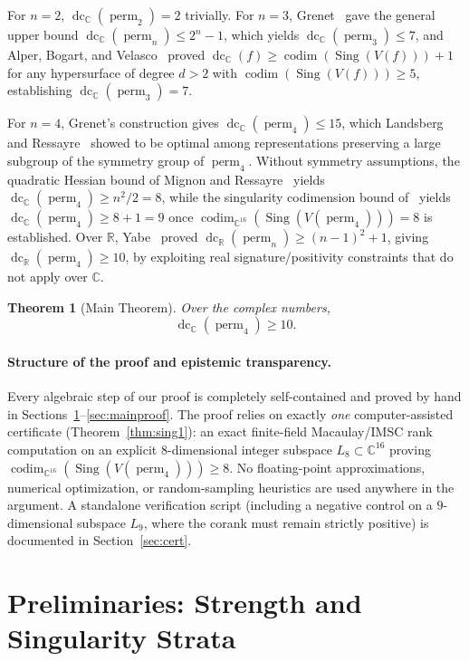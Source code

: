 \documentclass[11pt,a4paper]{article}
\newtheorem{theorem}{Theorem}[section]
\theoremstyle{definition}
\DeclareMathOperator{\perm}{perm}
\DeclareMathOperator{\dc}{dc}
\DeclareMathOperator{\codim}{codim}
\DeclareMathOperator{\Sing}{Sing}
\begin{document}
For $n = 2$, $\dc_{\mathbb{C}}(\perm_2) = 2$ trivially. For $n = 3$, Grenet~\cite{Grenet2011} gave the general upper bound $\dc_{\mathbb{C}}(\perm_n) \le 2^n - 1$, which yields $\dc_{\mathbb{C}}(\perm_3) \le 7$, and Alper, Bogart, and Velasco~\cite{ABV2017} proved $\dc_{\mathbb{C}}(f) \ge \codim(\Sing(V(f))) + 1$ for any hypersurface of degree $d > 2$ with $\codim(\Sing(V(f))) \ge 5$, establishing $\dc_{\mathbb{C}}(\perm_3) = 7$.

For $n = 4$, Grenet's construction gives $\dc_{\mathbb{C}}(\perm_4) \le 15$, which Landsberg and Ressayre~\cite{LR2017} showed to be optimal among representations preserving a large subgroup of the symmetry group of $\perm_4$. Without symmetry assumptions, the quadratic Hessian bound of Mignon and Ressayre~\cite{MR2004} yields $\dc_{\mathbb{C}}(\perm_4) \ge n^2/2 = 8$, while the singularity codimension bound of~\cite{ABV2017} yields $\dc_{\mathbb{C}}(\perm_4) \ge 8 + 1 = 9$ once $\codim_{\mathbb{C}^{16}}(\Sing(V(\perm_4))) = 8$ is established. Over $\mathbb{R}$, Yabe~\cite{Yabe2015} proved $\dc_{\mathbb{R}}(\perm_n) \ge (n-1)^2 + 1$, giving $\dc_{\mathbb{R}}(\perm_4) \ge 10$, by exploiting real signature/positivity constraints that do not apply over $\mathbb{C}$.

\begin{theorem}[Main Theorem]\label{thm:main}
Over the complex numbers,
\[
  \dc_{\mathbb{C}}(\perm_4) \ge 10.
\]
\end{theorem}

\paragraph{Structure of the proof and epistemic transparency.}
Every algebraic step of our proof is completely self-contained and proved by hand in Sections~\ref{sec:sing2}--\ref{sec:mainproof}. The proof relies on exactly \emph{one} computer-assisted certificate (Theorem~\ref{thm:sing1}): an exact finite-field Macaulay/IMSC rank computation on an explicit $8$-dimensional integer subspace $L_8 \subset \mathbb{C}^{16}$ proving $\codim_{\mathbb{C}^{16}}(\Sing(V(\perm_4))) \ge 8$. No floating-point approximations, numerical optimization, or random-sampling heuristics are used anywhere in the argument. A standalone verification script (including a negative control on a $9$-dimensional subspace $L_9$, where the corank must remain strictly positive) is documented in Section~\ref{sec:cert}.

\section{Preliminaries: Strength and Singularity Strata}\label{sec:sing2}
\end{document}
